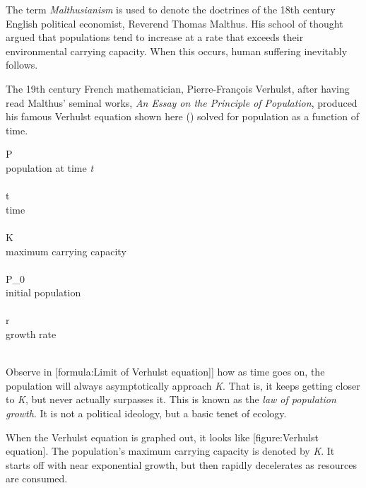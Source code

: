 The term {\it Malthusianism} is used to denote the doctrines of the 18th century English political economist, Reverend Thomas Malthus. His school of thought argued that populations tend to increase at a rate that exceeds their environmental carrying capacity. When this occurs, human suffering inevitably follows. 

The 19th century French mathematician, Pierre-François Verhulst, after having read Malthus' seminal works, {\it An Essay on the Principle of Population}, produced his famous Verhulst equation shown here () solved for population as a function of time.
\crlf

\startformula
{}
\stopformula
\startlegend
\leg P \\ population at time {\it t} \\ \\
\leg t \\ time \\ \\
\leg K \\ maximum carrying capacity \\ \\
\leg P_0 \\ initial population \\ \\
\leg r \\ growth rate \\ \\
\stoplegend
\crlf

Observe in [formula:Limit of Verhulst equation]] how as time goes on, the population will always asymptotically approach {\it K}. That is, it keeps getting closer to {\it K}, but never actually surpasses it. This is known as the {\it law of population growth}. It is not a political ideology, but a basic tenet of ecology.
\crlf

\startformula
{}
\stopformula
\crlf

When the Verhulst equation is graphed out, it looks like [figure:Verhulst equation]. The population's maximum carrying capacity is denoted by {\it K}. It starts off with near exponential growth, but then rapidly decelerates as resources are consumed.

    {}

